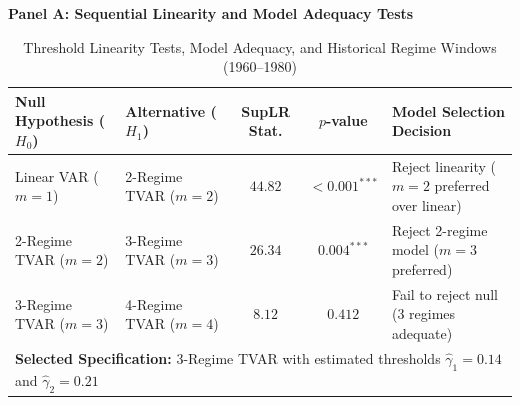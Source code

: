 \begin{table}[htbp]
\centering
\small
\caption{Threshold Linearity Tests, Model Adequacy, and Historical Regime Windows (1960--1980)}
\label{tab:tvar_tests}
\label{tab:tvar_threshold_tests}
\label{tab:regime_chronology}
\textbf{Panel A: Sequential Linearity and Model Adequacy Tests \citep{Hansen1999}}\\[0.3em]
\begin{tabularx}{\textwidth}{llcc>{\raggedright\arraybackslash}X}
\toprule
\textbf{Null Hypothesis ($H_0$)} & \textbf{Alternative ($H_1$)} & \textbf{SupLR Stat.} & \textbf{$p$-value} & \textbf{Model Selection Decision} \\
\midrule
Linear VAR ($m=1$) & 2-Regime TVAR ($m=2$) & $44.82$ & $<0.001^{***}$ & Reject linearity ($m=2$ preferred over linear) \\
2-Regime TVAR ($m=2$) & 3-Regime TVAR ($m=3$) & $26.34$ & $0.004^{***}$ & Reject 2-regime model ($m=3$ preferred) \\
3-Regime TVAR ($m=3$) & 4-Regime TVAR ($m=4$) & $8.12$ & $0.412$ & Fail to reject null (3 regimes adequate) \\
\midrule
\multicolumn{5}{l}{\textbf{Selected Specification:} 3-Regime TVAR with estimated thresholds $\hat{\gamma}_1 = 0.14$ and $\hat{\gamma}_2 = 0.21$} \\
\bottomrule
\end{tabularx}

\vspace{0.6em}


\end{table}
